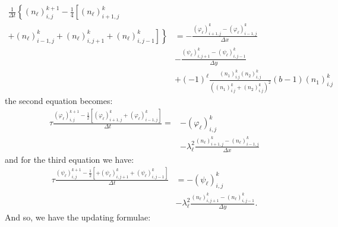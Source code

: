 \begin{align*}
\frac{1}{\Delta t}\left\{ \left(n_{\ell}\right)_{i,j}^{k+1}-\frac{1}{4}\left[\left(n_{\ell}\right)_{i+1,j}^{k}\right.\right.\\
\left.\left.+\left(n_{\ell}\right)_{i-1,j}^{k}+\left(n_{\ell}\right)_{i,j+1}^{k}+\left(n_{\ell}\right)_{i,j-1}^{k}\right]\right\}  & =-\frac{\left(\varphi_{\ell}\right)_{i+1,j}^{k}-\left(\varphi_{\ell}\right)_{i-1,j}^{k}}{\Delta x}\\
 & -\frac{\left(\psi_{\ell}\right)_{i,j+1}^{k}-\left(\psi_{\ell}\right)_{i,j-1}^{k}}{\Delta y}\\
 & +\left(-1\right)^{\ell}\frac{\left(n_{1}\right)_{i.j}^{k}\left(n_{2}\right)_{i,j}^{k}}{\left(\left(n_{1}\right)_{i.j}^{k}+\left(n_{2}\right)_{i.j}^{k}\right)^{2}}\left(b-1\right)\left(n_{1}\right)_{i.j}^{k}
\end{align*}
 the second equation becomes:
\begin{align*}
\tau\frac{\left(\varphi_{\ell}\right)_{i,j}^{k+1}-\frac{1}{2}\left[\left(\varphi_{\ell}\right)_{i+1,j}^{k}+\left(\varphi_{\ell}\right)_{i-1,j}^{k}\right]}{\Delta t}= & -\left(\varphi_{\ell}\right)_{i,j}^{k}\\
 & -\lambda_{\ell}^{2}\frac{\left(n_{\ell}\right)_{i+1,j}^{k}-\left(n_{\ell}\right)_{i-1,j}^{k}}{\Delta x}
\end{align*}
 and for the third equation we have:
\begin{align*}
\tau\frac{\left(\psi_{\ell}\right)_{i,j}^{k+1}-\frac{1}{2}\left[+\left(\psi_{\ell}\right)_{i,j+1}^{k}+\left(\psi_{\ell}\right)_{i,j-1}^{k}\right]}{\Delta t} & =-\left(\psi_{\ell}\right)_{i,j}^{k}\\
 & -\lambda_{\ell}^{2}\frac{\left(n_{\ell}\right)_{i,j+1}^{k}-\left(n_{\ell}\right)_{i,j-1}^{k}}{\Delta y}.
\end{align*}
And so, we have the updating formulae:
